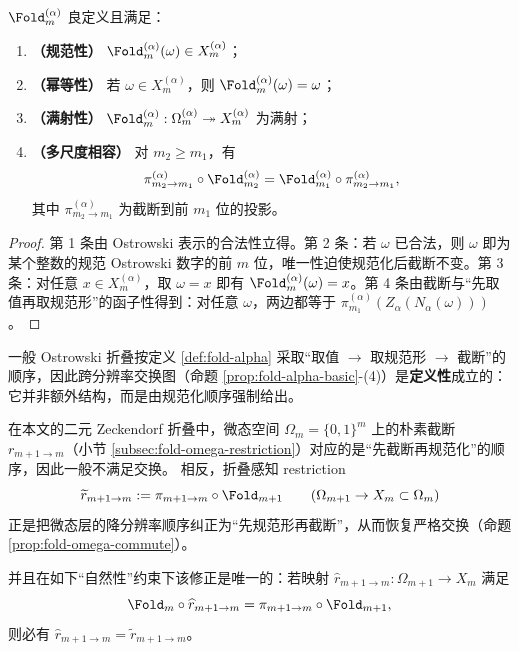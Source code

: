 \begin{proposition}[一般折叠的基本性质]\label{prop:fold-alpha-basic}
$\Fold_m^{(\alpha)}$ 良定义且满足：
\begin{enumerate}
  \item \textbf{（规范性）} $\Fold_m^{(\alpha)}(\omega)\in X_m^{(\alpha)}$；
  \item \textbf{（幂等性）} 若 $\omega\in X_m^{(\alpha)}$，则 $\Fold_m^{(\alpha)}(\omega)=\omega$；
  \item \textbf{（满射性）} $\Fold_m^{(\alpha)}:\Omega_m^{(\alpha)}\twoheadrightarrow X_m^{(\alpha)}$ 为满射；
  \item \textbf{（多尺度相容）} 对 $m_2\ge m_1$，有
  \[
  \pi_{m_2\to m_1}^{(\alpha)}\circ \Fold_{m_2}^{(\alpha)}=\Fold_{m_1}^{(\alpha)}\circ \pi_{m_2\to m_1}^{(\alpha)},
  \]
  其中 $\pi_{m_2\to m_1}^{(\alpha)}$ 为截断到前 $m_1$ 位的投影。
\end{enumerate}
\end{proposition}

\begin{proof}
第 1 条由 Ostrowski 表示的合法性立得。第 2 条：若 $\omega$ 已合法，则 $\omega$ 即为某个整数的规范 Ostrowski 数字的前 $m$ 位，唯一性迫使规范化后截断不变。第 3 条：对任意 $x\in X_m^{(\alpha)}$，取 $\omega=x$ 即有 $\Fold_m^{(\alpha)}(\omega)=x$。第 4 条由截断与“先取值再取规范形”的函子性得到：对任意 $\omega$，两边都等于 $\pi_{m_1}^{(\alpha)}(Z_\alpha(N_\alpha(\omega)))$。
\end{proof}

\begin{theorem}\label{thm:normalize-then-truncate-functorial}
一般 Ostrowski 折叠按定义 \ref{def:fold-alpha} 采取“取值 \(\to\) 取规范形 \(\to\) 截断”的顺序，因此跨分辨率交换图（命题 \ref{prop:fold-alpha-basic}-(4)）是\textbf{定义性}成立的：它并非额外结构，而是由规范化顺序强制给出。
\par
在本文的二元 Zeckendorf 折叠中，微态空间 \(\Omega_m=\{0,1\}^m\) 上的朴素截断 \(r_{m+1\to m}\)（小节 \ref{subsec:fold-omega-restriction}）对应的是“先截断再规范化”的顺序，因此一般不满足交换。
相反，折叠感知 restriction
\[
\widetilde r_{m+1\to m}:=\pi_{m+1\to m}\circ \Fold_{m+1}\qquad(\Omega_{m+1}\to X_m\subset\Omega_m)
\]
正是把微态层的降分辨率顺序纠正为“先规范形再截断”，从而恢复严格交换（命题 \ref{prop:fold-omega-commute}）。
\par
并且在如下“自然性”约束下该修正是唯一的：若映射 \(\widehat r_{m+1\to m}:\Omega_{m+1}\to X_m\) 满足
\[
\Fold_m\circ \widehat r_{m+1\to m}=\pi_{m+1\to m}\circ \Fold_{m+1},
\]
则必有 \(\widehat r_{m+1\to m}=\widetilde r_{m+1\to m}\)。
\end{theorem}

